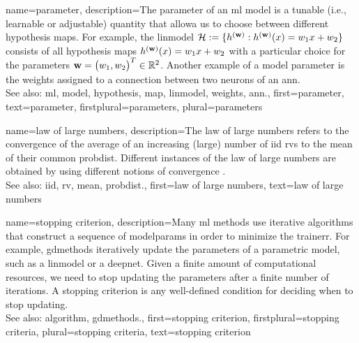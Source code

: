 {name={parameter},
	description={The parameter of an \gls{ml} \gls{model} is a tunable 
		(i.e., learnable or adjustable) quantity that allowa us to choose 
		between different \gls{hypothesis} \glspl{map}. For example, the \gls{linmodel} $\mathcal{H} := \{h^{({\bf w})}: h^{({\bf w})}(x)= w_{1} x + w_{2}\}$ 
		consists of all \gls{hypothesis} \glspl{map} $h^{({\bf w})}(x)= w_{1} x + w_{2}$ 
		with a particular choice for the parameters ${\bf w} = \big(w_{1},w_{2}\big)^{T} \in \mathbb{R}^{2}$. 
		Another example of a \gls{model} parameter is the \gls{weights} assigned to a connection between two neurons of an \gls{ann}.
				\\
		See also: \gls{ml}, \gls{model}, \gls{hypothesis}, \gls{map}, \gls{linmodel}, \gls{weights}, \gls{ann}.},
	first={parameter},
	text={parameter},
	firstplural={parameters}, 
 	plural={parameters}
}

{name={law of large numbers},
	description={The law of large numbers refers to the 
		convergence of the average of an increasing (large) number of \gls{iid} \glspl{rv} 
		to the \gls{mean} of their common \gls{probdist}. Different instances of the 
		law of large numbers are obtained by using different notions of convergence \cite{papoulis}.
				\\
		See also: \gls{iid}, \gls{rv}, \gls{mean}, \gls{probdist}.},
	first={law of large numbers},
	text={law of large numbers}
}
    
{name={stopping criterion},
	description={Many \gls{ml} methods use iterative \glspl{algorithm} 
		that construct a sequence of \gls{modelparams} in order to minimize the \gls{trainerr}. 
		For example, \gls{gdmethods} iteratively update the \glspl{parameter} of a parametric \gls{model}, 
		such as a \gls{linmodel} or a \gls{deepnet}. Given a finite amount of computational 
		resources, we need to stop updating the \glspl{parameter} after a finite number of iterations. 
		A stopping criterion is any well-defined condition for deciding when to stop  
		updating.
				\\
		See also: \gls{algorithm}, \gls{gdmethods}.},
		first={stopping criterion},
		firstplural={stopping criteria},
		plural={stopping criteria}, 
		text={stopping criterion}
}

